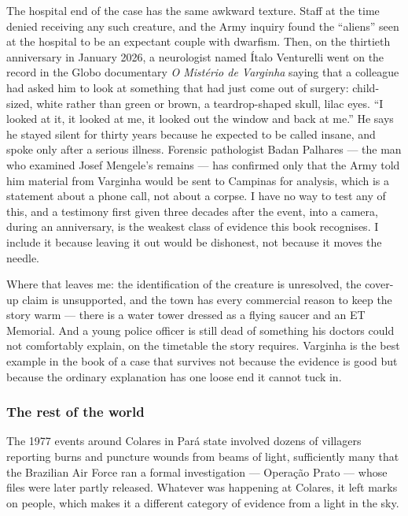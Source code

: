 The hospital end of the case has the same awkward texture. Staff at the time denied
receiving any such creature, and the Army inquiry found the ``aliens'' seen at the hospital
to be an expectant couple with dwarfism. Then, on the thirtieth anniversary in January 2026,
a neurologist named \'Italo Venturelli went on the record in the Globo documentary
\emph{O Mist\'erio de Varginha} saying that a colleague had asked him to look at something
that had just come out of surgery: child-sized, white rather than green or brown, a
teardrop-shaped skull, lilac eyes. ``I looked at it, it looked at me, it looked out the
window and back at me.'' He says he stayed silent for thirty years because he expected to be
called insane, and spoke only after a serious illness. Forensic pathologist Badan Palhares
--- the man who examined Josef Mengele's remains --- has confirmed only that the Army told him
material from Varginha would be sent to Campinas for analysis, which is a statement about a
phone call, not about a corpse. I have no way to test any of this, and a testimony first
given three decades after the event, into a camera, during an anniversary, is the weakest
class of evidence this book recognises. I include it because leaving it out would be
dishonest, not because it moves the needle.

Where that leaves me: the identification of the creature is unresolved, the cover-up claim
is unsupported, and the town has every commercial reason to keep the story warm --- there is
a water tower dressed as a flying saucer and an ET Memorial. And a young police officer is
still dead of something his doctors could not comfortably explain, on the timetable the
story requires. Varginha is the best example in the book of a case that survives not because
the evidence is good but because the ordinary explanation has one loose end it cannot tuck
in.

\subsubsection*{The rest of the world}

The 1977 events around Colares in Par\'a state involved dozens of villagers
reporting burns and puncture wounds from beams of light, sufficiently many that the
Brazilian Air Force ran a formal investigation --- Opera\c{c}\~ao Prato --- whose files
were later partly released. Whatever was happening at Colares, it left marks on people,
which makes it a different category of evidence from a light in the sky.

